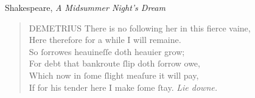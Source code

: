 \begin{texts}{Shakespeare, \emph{A Midsummer Night's Dream}}
\begin{quote}
	DEMETRIUS There is no following her in this fierce vaine,\\
	\phantom{DEMETRIUS} Here therefore for a while I will remaine.\\
	\phantom{DEMETRIUS} So ſorrowes heauineſſe doth heauier grow;\\
	\phantom{DEMETRIUS} For debt that bankroute ſlip doth ſorrow owe,\\
	\phantom{DEMETRIUS} Which now in ſome ſlight meaſure it will pay,\\
	\phantom{DEMETRIUS} If for his tender here I make ſome ſtay. \hfill \emph{Lie downe.}
\end{quote}


\end{texts}


\largerpage

